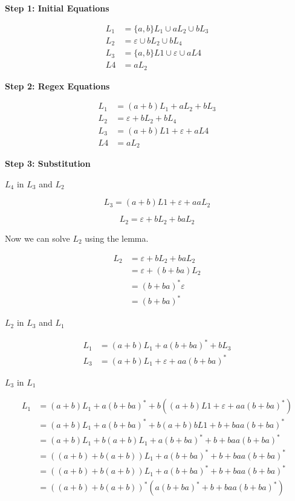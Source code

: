 \textbf{Step 1: Initial Equations}

\begin{align*}
    L_1 &= \{a,b\}L_1 \cup aL_2 \cup bL_3\\
    L_2 &= \varepsilon \cup bL_2 \cup b L_4 \\
    L_3 &= \{a,b\}L1 \cup \varepsilon \cup aL4 \\
    L4  &= aL_2
\end{align*}

\textbf{Step 2: Regex Equations}

\begin{align*}
L_1 &= (a+b)L_1 + aL_2 +bL_3\\
L_2 &= \varepsilon + bL_2 + b L_4 \\
L_3 &= (a+b)L1 + \varepsilon + aL4 \\
L4  &= aL_2
\end{align*}

\textbf{Step 3: Substitution}

\(L_4\) in \(L_3\) and \(L_2\)

\[
    L_3 = (a+b)L1 + \varepsilon + aaL_2
\]

\[
    L_2 = \varepsilon + bL_2 + baL_2
\]

Now we can solve \(L_2\) using the lemma.

\begin{align*}
    L_2 &= \varepsilon + bL_2 + baL_2 \\
        &= \varepsilon + (b + ba)L_2 \\
        &= (b + ba)^*\varepsilon \\
        &= (b + ba)^*
\end{align*}

\(L_2\) in \(L_3\) and \(L_1\) 

\begin{align*}
    L_1 &= (a+b)L_1 + a(b + ba)^* +bL_3\\
    L_3 &= (a+b)L_1 + \varepsilon + aa(b + ba)^* 
\end{align*}

\(L_3\) in  \(L_1\)

\begin{align*}
    L_1 &= (a+b)L_1 + a(b + ba)^* +b((a+b)L1 + \varepsilon + aa(b + ba)^*)\\
        &= (a+b)L_1 + a(b + ba)^* +b(a+b)bL1 + b + baa(b + ba)^*\\
        &= (a+b)L_1  + b(a+b)L_1 + a(b + ba)^* + b + baa(b + ba)^*\\
        &= ((a+b)  + b(a+b))L_1 + a(b + ba)^* + b + baa(b + ba)^*\\
        &= ((a+b)  + b(a+b))L_1 + a(b + ba)^* + b + baa(b + ba)^*\\
        &= ((a+b)  + b(a+b))^*(a(b + ba)^* + b + baa(b + ba)^*)
\end{align*}

